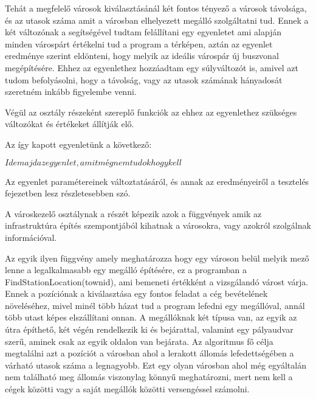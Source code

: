 Tehát a megfelelő városok kiválasztásánál két fontos tényező a városok távolsága, és az utasok száma amit a városban elhelyezett megálló szolgáltatni tud. Ennek a két változónak a segítségével tudtam felállítani egy egyenletet ami alapján minden várospárt értékelni tud a program a térképen, aztán az egyenlet eredménye szerint eldönteni, hogy melyik az ideális várospár új buszvonal megépítésére. Ehhez az egyenlethez hozzáadtam egy súlyváltozót is, amivel azt tudom befolyásolni, hogy a távolság, vagy az utasok számának hányadosát szeretném inkább figyelembe venni.

Végül az osztály részeként szereplő funkciók az ehhez az egyenlethez szükséges változókat és értékeket állítják elő.

Az így kapott egyenletünk a következő:

$ Ide majd az egyenlet, amit még nem tudok hogy kell $

Az egyenlet paramétereinek változtatásáról, és annak az eredményeiről a tesztelés fejezetben lesz részletesebben szó.


A városkezelő osztálynak a részét képezik azok a függvények amik az infrastruktúra építés szempontjából kihatnak a városokra, vagy azokról szolgálnak információval.

Az egyik ilyen függvény amely meghatározza hogy egy városon belül melyik mező lenne a legalkalmasabb egy megálló építésére, ez a programban a FindStationLocation(townid), ami bemeneti értékként a vizsgálandó várost várja. Ennek a pozíciónak a kiválasztása egy fontos feladat a cég bevételének növeléséhez, mivel minél több házat tud a program lefedni egy megállóval, annál több utast képes elszállítani onnan. A megállóknak két típusa van, az egyik az útra építhető, két végén rendelkezik ki és bejárattal, valamint egy pályaudvar szerű, aminek csak az egyik oldalon van bejárata. Az algoritmus fő célja megtalálni azt a pozíciót a városban ahol a lerakott állomás lefedettségében a várható utasok száma a legnagyobb. Ezt egy olyan városban ahol még egyáltalán nem található meg állomás viszonylag könnyű meghatározni, mert nem kell a cégek közötti vagy a saját megállók közötti versengéssel számolni.


